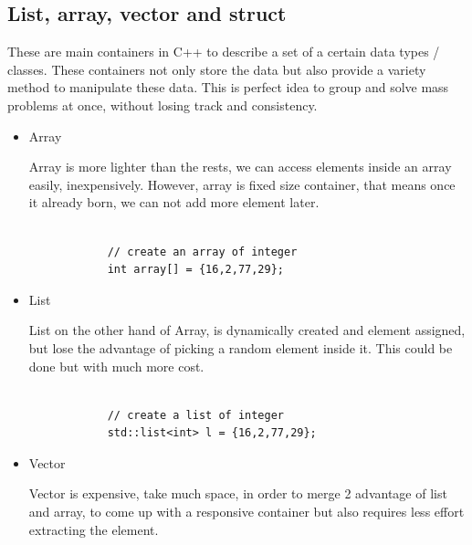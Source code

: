 \documentclass[english]{article}
\begin{document}
{\subsection{List, array, vector and struct}
	
	These are main containers in C++ to describe a set of a certain data types / classes. These containers not only store the data but also provide a variety method to manipulate these data. This is perfect idea to group and solve mass problems at once, without losing track and consistency. 
	
	
	\begin{itemize}
		\item Array
		
		Array is more lighter than the rests, we can access elements inside an array easily, inexpensively. However, array is fixed size container, that means once it already born, we can not add more element later. 
		
		\lstset{language=C++}
		\begin{lstlisting}
		
			// create an array of integer
			int array[] = {16,2,77,29};
		\end{lstlisting}
	\end{itemize}
	
	
	\begin{itemize}
		\item List
		
		List on the other hand of Array, is dynamically created and element assigned, but lose the advantage of picking a random element inside it. This could be done but with much more cost.
		
		\lstset{language=C++}
		\begin{lstlisting}
		
			// create a list of integer
			std::list<int> l = {16,2,77,29};
		\end{lstlisting}
		
	\end{itemize}


	\begin{itemize}
		\item Vector
		
		Vector is expensive, take much space, in order to merge 2 advantage of list and array, to come up with a responsive container but also requires less effort extracting the element.
		
		\lstset{language=C++}
		\begin{lstlisting}
		

\end{lstlisting}
\end{itemize}}
\end{document}
